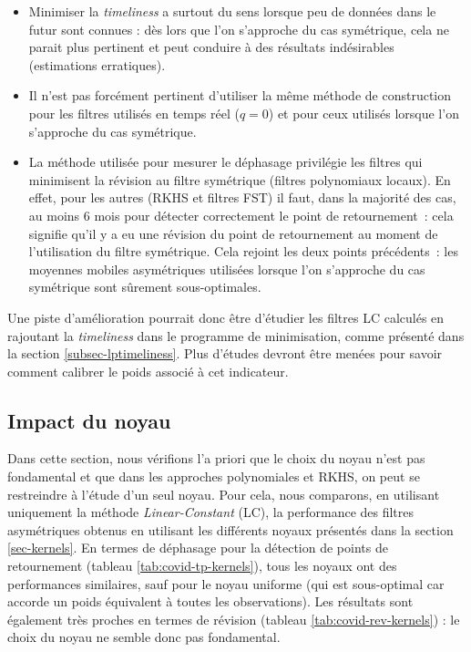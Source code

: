 \documentclass[
  11pt,
  french,
  a4paper]{article}
\newcommand\1{\mathds{1}}
\begin{document}
\begin{itemize}
\item
  Minimiser la \emph{timeliness} a surtout du sens lorsque peu de données dans le futur sont connues : dès lors que l'on s'approche du cas symétrique, cela ne parait plus pertinent et peut conduire à des résultats indésirables (estimations erratiques).
\item
  Il n'est pas forcément pertinent d'utiliser la même méthode de construction pour les filtres utilisés en temps réel (\(q=0\)) et pour ceux utilisés lorsque l'on s'approche du cas symétrique.
\item
  La méthode utilisée pour mesurer le déphasage privilégie les filtres qui minimisent la révision au filtre symétrique (filtres polynomiaux locaux).
  En effet, pour les autres (RKHS et filtres FST) il faut, dans la majorité des cas, au moins 6 mois pour détecter correctement le point de retournement~: cela signifie qu'il y a eu une révision du point de retournement au moment de l'utilisation du filtre symétrique.
  Cela rejoint les deux points précédents~: les moyennes mobiles asymétriques utilisées lorsque l'on s'approche du cas symétrique sont sûrement sous-optimales.
\end{itemize}

Une piste d'amélioration pourrait donc être d'étudier les filtres LC calculés en rajoutant la \emph{timeliness} dans le programme de minimisation, comme présenté dans la section \ref{subsec-lptimeliness}.
Plus d'études devront être menées pour savoir comment calibrer le poids associé à cet indicateur.

\hypertarget{impact-du-noyau}{%
\subsection{Impact du noyau}\label{impact-du-noyau}}

Dans cette section, nous vérifions l'a priori que le choix du noyau n'est pas fondamental et que dans les approches polynomiales et RKHS, on peut se restreindre à l'étude d'un seul noyau.
Pour cela, nous comparons, en utilisant uniquement la méthode \emph{Linear-Constant} (LC), la performance des filtres asymétriques obtenus en utilisant les différents noyaux présentés dans la section \ref{sec-kernels}.
En termes de déphasage pour la détection de points de retournement (tableau \ref{tab:covid-tp-kernels}), tous les noyaux ont des performances similaires, sauf pour le noyau uniforme (qui est sous-optimal car accorde un poids équivalent à toutes les observations).
Les résultats sont également très proches en termes de révision (tableau \ref{tab:covid-rev-kernels}) : le choix du noyau ne semble donc pas fondamental.
\end{document}

